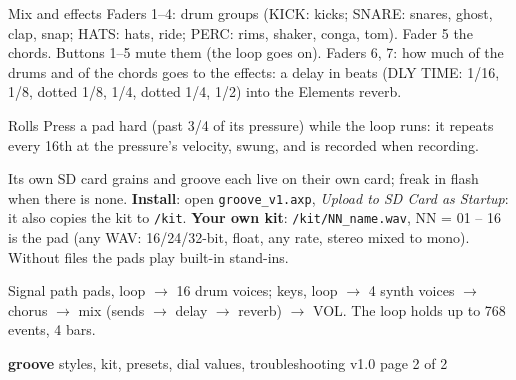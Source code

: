 \documentclass{article}
\newcommand{\GV}[1]{\textcolor{gvc}{#1}}
\newcommand{\DR}[1]{\textcolor{drc}{#1}}
\begin{document}
\begin{minipage}[t]{68mm}\vspace{0pt}
\begin{card}{Mix and effects}
Faders 1--4: drum groups (\DR{KICK}: kicks; \DR{SNARE}: snares, ghost, clap, snap;
\DR{HATS}: hats, ride; \DR{PERC}: rims, shaker, conga, tom). Fader 5 the chords. Buttons 1--5 mute them
(the loop goes on). Faders 6, 7: how much of the drums and of the chords goes to the effects:
a delay in beats (\GV{DLY TIME}: 1/16, 1/8, dotted 1/8, 1/4, dotted 1/4, 1/2) into the Elements reverb.
\end{card}
\begin{card}{Rolls}
Press a pad hard (past 3/4 of its pressure) while the loop runs: it repeats every 16th at the
pressure's velocity, swung, and is recorded when recording.
\end{card}
\end{minipage}\hfill
\begin{minipage}[t]{63mm}\vspace{0pt}
\begin{card}{Its own SD card}
grains and groove each live on their own card; freak in flash when there is none.
\textbf{Install}: open \texttt{groove\_v1.axp}, \emph{Upload to SD Card as Startup}: it also copies the kit to
\texttt{/kit}. \textbf{Your own kit}: \texttt{/kit/NN\_name.wav}, NN = 01 -- 16 is the pad (any WAV:
16/24/32-bit, float, any rate, stereo mixed to mono). Without files the pads play built-in stand-ins.
\end{card}
\begin{card}{Signal path}
pads, loop \(\to\) 16 drum voices; keys, loop \(\to\) 4 synth voices \(\to\) chorus \(\to\) mix
(sends \(\to\) delay \(\to\) reverb) \(\to\) VOL. The loop holds up to 768 events, 4 bars.
\end{card}
\end{minipage}

\newpage
{\fontsize{16}{18}\selectfont\bfseries groove}\hspace{3mm}%
{\fontsize{9.5}{11}\selectfont styles, kit, presets, dial values, troubleshooting}\hfill
{\fontsize{7}{8}\selectfont\color{black!55} v1.0 \textperiodcentered{} page 2 of 2}
\end{document}
